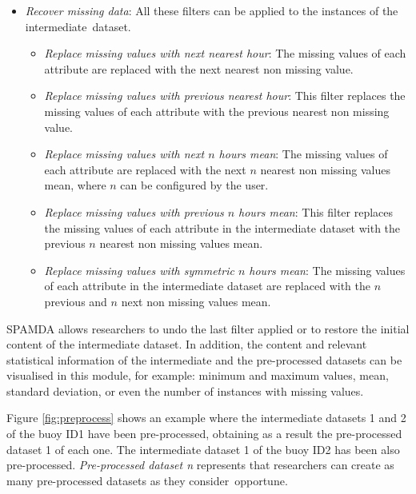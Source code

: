 \documentclass[energies,article,accept,moreauthors,pdftex]{Definitions/mdpi}
\begin{document}
\begin{paracol}{2}
\begin{itemize}
				 \item \textit{Recover missing data}: All these filters can be applied to the instances of the intermediate~dataset.
					\begin{itemize}
						\item \textit{Replace missing values with next nearest hour}: The missing values of each attribute are replaced with the next nearest non missing value.
						\item \textit{Replace missing values with previous nearest hour}: This filter replaces the missing values of each attribute with the previous nearest non missing value.
						\item \textit{Replace missing values with next $n$ hours mean}: The missing values of each attribute are replaced with the next $n$ nearest non missing values mean, where $n$ can be configured by the user.
						\item \textit{Replace missing values with previous $n$ hours mean}: This filter replaces the missing values of each attribute in the intermediate dataset with the previous $n$ nearest non missing values mean.
						\item \textit{Replace missing values with symmetric $n$ hours mean}: The missing values of each attribute in the intermediate dataset are replaced with the $n$ previous and $n$ next non missing values mean.
					\end{itemize}
				 
				\end{itemize}
				
				SPAMDA allows researchers to undo the last filter applied or to restore the initial content of the intermediate dataset. In addition, the content and relevant statistical information of the intermediate and the pre-processed datasets can be visualised in this module, for example: minimum and maximum values, mean, standard deviation, or even the number of instances with missing values.
				
				Figure \ref{fig:preprocess} shows an example where the intermediate datasets 1 and 2 of the buoy ID1 have been pre-processed, obtaining as a result the pre-processed dataset 1 of each one. The intermediate dataset 1 of the buoy ID2 has been also pre-processed. \textit{Pre-processed dataset n} represents that researchers can create as many pre-processed datasets as they consider~opportune.
				

\end{paracol}
\end{document}
